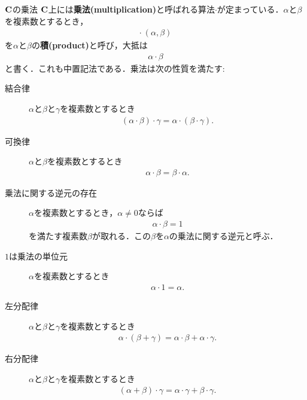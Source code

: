 	\begin{itembox}[l]{$\mathbf{C}$の乗法}
		$\mathbf{C}$上には{\bf 乗法}{\bf (multiplication)}と呼ばれる算法$\cdot$が定まっている．$\alpha$と$\beta$を複素数とするとき，
		\begin{align}
			\cdot\ (\alpha,\beta)
		\end{align}
		を$\alpha$と$\beta$の{\bf 積}{\bf (product)}と呼び，大抵は
		\begin{align}
			\alpha \cdot \beta
		\end{align}
		と書く．これも中置記法である．乗法は次の性質を満たす:
		\begin{description}
			\item[結合律] $\alpha$と$\beta$と$\gamma$を複素数とするとき
				\begin{align}
					(\alpha \cdot \beta) \cdot \gamma = \alpha \cdot (\beta \cdot \gamma).
				\end{align}
				
			\item[可換律]  $\alpha$と$\beta$を複素数とするとき
				\begin{align}
					\alpha \cdot \beta = \beta \cdot \alpha.
				\end{align}
				
			\item[乗法に関する逆元の存在] $\alpha$を複素数とするとき，$\alpha \neq 0$ならば
				\begin{align}
					\alpha \cdot \beta = 1
				\end{align}
				を満たす複素数$\beta$が取れる．この$\beta$を$\alpha$の乗法に関する逆元と呼ぶ．
				
			\item[$1$は乗法の単位元] $\alpha$を複素数とするとき
				\begin{align}
					\alpha \cdot 1 = \alpha.
				\end{align}
				
			\item[左分配律] $\alpha$と$\beta$と$\gamma$を複素数とするとき
				\begin{align}
					\alpha \cdot (\beta + \gamma) = \alpha \cdot \beta + \alpha \cdot \gamma.
				\end{align}
				
			\item[右分配律] $\alpha$と$\beta$と$\gamma$を複素数とするとき
				\begin{align}
					(\alpha + \beta) \cdot \gamma = \alpha \cdot \gamma + \beta \cdot \gamma.
				\end{align}
		\end{description}
	\end{itembox}
	
